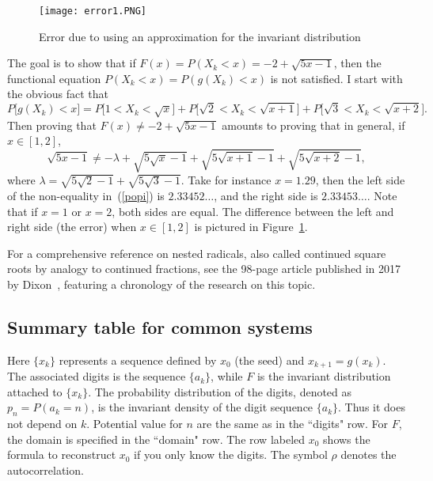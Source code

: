 \documentclass[oneside,10pt]{book}
\begin{document}
\begin{figure}[H]
\centering
\texttt{[image: error1.PNG]} %
\caption{Error due to using an approximation for the invariant distribution}
\label{err32}
\end{figure}

The goal is to show that if $F(x)=P(X_k<x) = -2+\sqrt{5x-1}$, then the functional equation $P(X_k<x) = P(g(X_k)<x)$ is not satisfied.
I start with the obvious fact that
$$ P\Big[g(X_k)< x\Big] = P\Big[1<X_k<\sqrt{x}\Big] + P\Big[\sqrt{2}<X_k<\sqrt{x+1}\Big] + P\Big[\sqrt{3}<X_k<\sqrt{x+2}\Big].$$
Then proving that $F(x) \neq -2+\sqrt{5x-1}$ amounts to proving that in general, if $x\in [1, 2]$,
\begin{equation}
\sqrt{5x-1} \neq -\lambda + \sqrt{5\sqrt{x}-1} + \sqrt{5\sqrt{x+1}-1} + \sqrt{5\sqrt{x+2}-1},\label{popi}
\end{equation}
where $\lambda = \sqrt{5\sqrt{2}-1} +  \sqrt{5\sqrt{3}-1}$. Take for instance $x=1.29$, then
the left side of the non-equality in~(\ref{popi}) is $2.33452\dots$, and the right side is $2.33453\dots$. Note that 
 if $x=1$ or $x=2$, both sides are equal. The difference between the left and right side (the error) when $x\in[1,2]$ is pictured 
 in Figure~\ref{err32}.

For a comprehensive reference on nested radicals, also called continued square roots by analogy to continued fractions, see the 98-page article published in 2017 by 
Dixon~\cite{sccf17}, featuring a chronology of the research on this topic. 


\subsection{Summary table for common systems}\label{sunbvc}

Here $\{x_k\}$ represents a sequence defined by $x_0$ (the \textcolor{index}{seed}) and $x_{k+1}=g(x_k)$. The associated \textcolor{index}{digits} is the sequence $\{a_k\}$,
 while $F$ is the \textcolor{index}{invariant distribution} attached to $\{x_k\}$. 
 The probability distribution 
 of the digits, denoted as $p_n = P(a_k=n)$, is the invariant density of the digit sequence $\{a_k\}$. 
 Thus it does not depend on $k$. Potential value for $n$ are the same as in the ``digits" row. For $F$,
 the domain is specified in the ``domain" row. The row labeled $x_0$ shows the formula 
 to reconstruct $x_0$ if you only know the digits.
The symbol $\rho$ denotes the autocorrelation.
\end{document}
